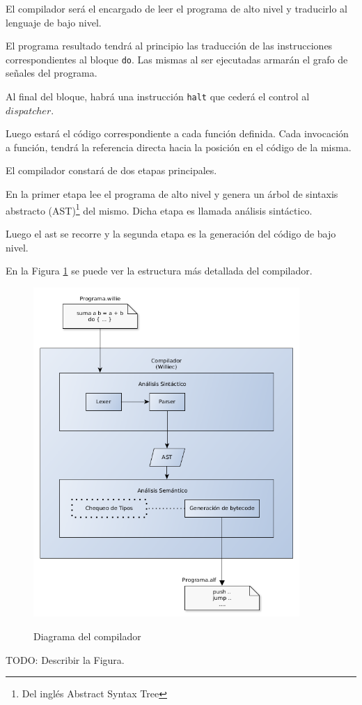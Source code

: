   El compilador será el encargado de leer el programa de alto nivel y
traducirlo al lenguaje de bajo nivel.

  El programa resultado tendrá al principio las traducción de las
instrucciones correspondientes al bloque \texttt{do}.
  Las mismas al ser ejecutadas armarán el grafo de señales del programa.

  Al final del bloque, habrá una instrucción \texttt{halt} que cederá el
control al $dispatcher$.

  Luego estará el código correspondiente a cada función definida.
  Cada invocación a función, tendrá la referencia directa hacia la
posición en el código de la misma.

  El compilador constará de dos etapas principales.

  En la primer etapa lee el programa de alto nivel y
genera un árbol de sintaxis abstracto 
(AST)\footnote{Del inglés Abstract Syntax Tree} del mismo.
  Dicha etapa es llamada análisis sintáctico.

  Luego el ast se recorre y la segunda etapa es la generación del
código de bajo nivel.

  En la Figura \ref{fig:compiler} se puede ver la estructura más detallada
  del compilador.

\begin{figure}[hp]
\begin{center}
\caption{Diagrama del compilador}
\includegraphics[width=0.9\textwidth]{graphs/compiler.png}
\label{fig:compiler}
\end{center}
\end{figure}

  TODO: Describir la Figura.

\newpage

